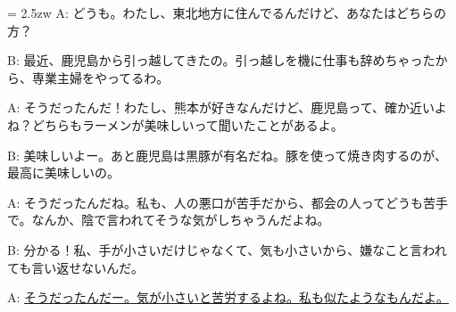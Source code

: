 \documentclass[11pt]{amsart}
\title{}
\author{}
\newenvironment{hangall}[1]{\hangindent = 2.5zw\everypar{\hangindent = 2.5zw}}{}
\begin{document}
\maketitle
\begin{hangall}{}%
A: どうも。わたし、東北地方に住んでるんだけど、あなたはどちらの方？

B: 最近、鹿児島から引っ越してきたの。引っ越しを機に仕事も辞めちゃったから、専業主婦をやってるわ。

A: そうだったんだ！わたし、熊本が好きなんだけど、鹿児島って、確か近いよね？どちらもラーメンが美味しいって聞いたことがあるよ。

B: 美味しいよー。あと鹿児島は黒豚が有名だね。豚を使って焼き肉するのが、最高に美味しいの。

A: そうだったんだね。私も、人の悪口が苦手だから、都会の人ってどうも苦手で。なんか、陰で言われてそうな気がしちゃうんだよね。

B: 分かる！私、手が小さいだけじゃなくて、気も小さいから、嫌なこと言われても言い返せないんだ。

A: \ul{そうだったんだー。気が小さいと苦労するよね。私も似たようなもんだよ。}\end{hangall}
\end{document}
